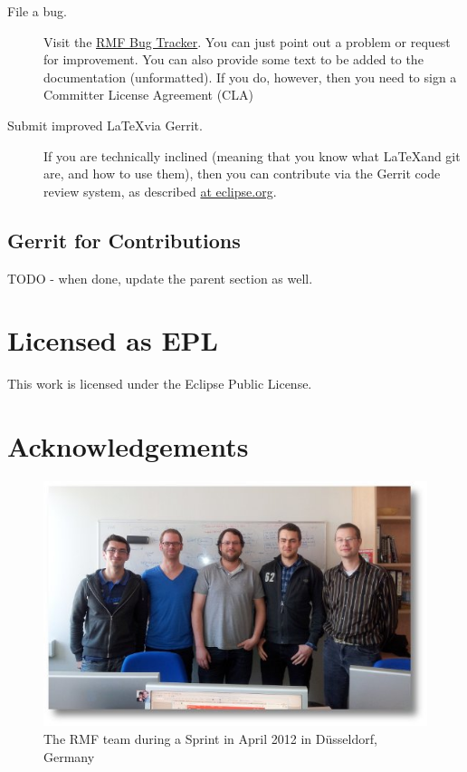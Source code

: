 \begin{description}
  \item[File a bug.]  Visit the \href{https://bugs.eclipse.org/bugs/enter_bug.cgi?assigned_to=&blocked=&bug_severity=normal&bug_status=NEW&comment=&contenttypeentry=&contenttypemethod=autodetect&data=&dependson=&description=&flag_type-1=X&flag_type-11=X&flag_type-12=X&flag_type-2=X&flag_type-4=X&flag_type-6=X&flag_type-7=X&flag_type-8=X&form_name=enter_bug&keywords=&&op_sys=All&product=MDT.RMF&qa_contact=&rep_platform=All&short_desc=&version=unspecified}{RMF Bug Tracker}.  You can just point out a problem or request for improvement.  You can also provide some text to be added to the documentation (unformatted).  If you do, however, then you need to sign a Committer License Agreement (CLA)
  \item[Submit improved \LaTeX via Gerrit.]  If you are technically inclined (meaning that you know what \LaTeX and git are, and how to use them), then you can contribute via the Gerrit code review system, as described \href{https://wiki.eclipse.org/Gerrit}{at eclipse.org}.
\end{description}

\subsection{Gerrit for Contributions}

TODO - when done, update the parent section as well.

\section{Licensed as EPL}

This work is licensed under the Eclipse Public License.

\section{Acknowledgements}

\begin{figure}
  \centering
  \includegraphics[width=\textwidth]{../rmf-images/2012_03_sprint_team.jpg}
  \caption{The RMF team during a Sprint in April 2012 in Düsseldorf, Germany}
  \label{fig:intro_core_team}
\end{figure}

